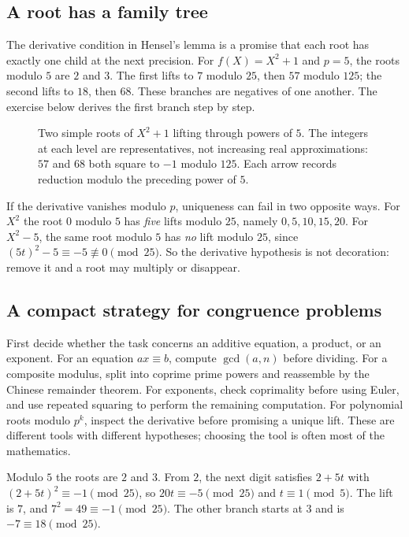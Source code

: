 \subsection*{A root has a family tree}
The derivative condition in Hensel's lemma is a promise that each root has exactly one child at the next precision. For $f(X)=X^2+1$ and $p=5$, the roots modulo $5$ are $2$ and $3$. The first lifts to $7$ modulo $25$, then $57$ modulo $125$; the second lifts to $18$, then $68$. These branches are negatives of one another. The exercise below derives the first branch step by step.

\begin{figure}[ht]
\centering{}
\caption{Two simple roots of $X^2+1$ lifting through powers of $5$. The integers at each level are representatives, not increasing real approximations: $57$ and $68$ both square to $-1$ modulo $125$. Each arrow records reduction modulo the preceding power of $5$.}
\label{fig:hensel-branches}
\end{figure}

If the derivative vanishes modulo $p$, uniqueness can fail in two opposite ways. For $X^2$ the root $0$ modulo $5$ has \emph{five} lifts modulo $25$, namely $0,5,10,15,20$. For $X^2-5$, the same root modulo $5$ has \emph{no} lift modulo $25$, since $(5t)^2-5\equiv-5\not\equiv0\pmod{25}$. So the derivative hypothesis is not decoration: remove it and a root may multiply or disappear.

\subsection*{A compact strategy for congruence problems}
First decide whether the task concerns an additive equation, a product, or an exponent. For an equation $ax\equiv b$, compute $\gcd(a,n)$ before dividing. For a composite modulus, split into coprime prime powers and reassemble by the Chinese remainder theorem. For exponents, check coprimality before using Euler, and use repeated squaring to perform the remaining computation. For polynomial roots modulo $p^k$, inspect the derivative before promising a unique lift. These are different tools with different hypotheses; choosing the tool is often most of the mathematics.

\begin{examplex}
Modulo $5$ the roots are $2$ and $3$. From $2$, the next digit satisfies $2+5t$ with $(2+5t)^2\equiv -1\pmod{25}$, so $20t\equiv -5\pmod{25}$ and $t\equiv 1\pmod 5$. The lift is $7$, and $7^2=49\equiv -1\pmod{25}$. The other branch starts at $3$ and is $-7\equiv 18\pmod{25}$.
\end{examplex}

